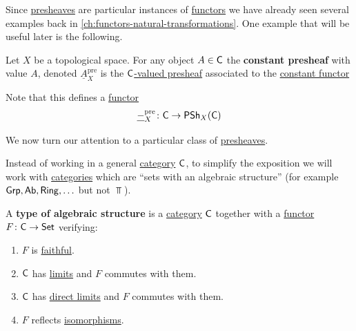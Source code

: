 \documentclass[../../main]{subfiles}
\begin{document}
Since \hyperref[def:presheaf]{presheaves} are particular instances of \hyperref[def:functor]{functors} we have already seen several examples back in \autoref{ch:functors-natural-transformations}.
One example that will be useful later is the following.
\begin{definition}\label{def:constant-presheaf}
  Let \(X\) be a topological space.
  For any object \(A \in \mathsf{C}\) the \textbf{constant presheaf} with value \(A\), denoted \(\underline{A}_{X}^{\operatorname{pre}}\) is the \hyperref[def:presheaf]{\(\mathsf{C}\)-valued presheaf} associated to the \hyperref[ex:constant-functor]{constant functor}
  \begin{center}
  \end{center}

  Note that this defines a \hyperref[def:functor]{functor}
  \begin{align*}
    \underline{-}_{X}^{\operatorname{pre}}\colon \mathsf{C} \to \mathsf{PSh}_{X}(\mathsf{C})
  \end{align*}
\end{definition}

We now turn our attention to a particular class of \hyperref[def:presheaf]{presheaves}.

Instead of working in a general \hyperref[def:category]{category} \(\mathsf{C}\), to simplify the exposition we will work with \hyperref[def:category]{categories} which are ``sets with an algebraic structure'' (for example \(\mathsf{Grp}, \mathsf{Ab}, \mathsf{Ring}, \ldots\) but not \(\Top\)).

\begin{definition}\label{def:algebraic-structure}
  A \textbf{type of algebraic structure} is a \hyperref[def:category]{category} \(\mathsf{C}\) together with a \hyperref[def:functor]{functor} \(F\colon \mathsf{C} \to \mathsf{Set}\) verifying:
  \begin{enumerate}
    \item \(F\) is \hyperref[def:functor-types]{faithful}.
    \item \(\mathsf{C}\) has \hyperref[def:categorical-limit]{limits} and \(F\) commutes with them.
    \item \(\mathsf{C}\) has \hyperref[def:direct-limit]{direct limits} and \(F\) commutes with them.
    \item \(F\) reflects \hyperref[def:categorical-isomorphism]{isomorphisms}.
  \end{enumerate}
\end{definition}
\end{document}
